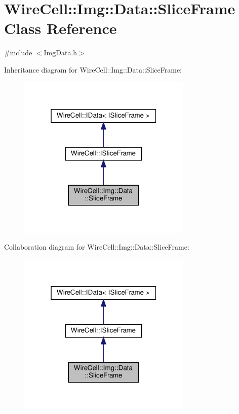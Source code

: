 \hypertarget{class_wire_cell_1_1_img_1_1_data_1_1_slice_frame}{}\section{Wire\+Cell\+:\+:Img\+:\+:Data\+:\+:Slice\+Frame Class Reference}
\label{class_wire_cell_1_1_img_1_1_data_1_1_slice_frame}


{\ttfamily \#include $<$Img\+Data.\+h$>$}



Inheritance diagram for Wire\+Cell\+:\+:Img\+:\+:Data\+:\+:Slice\+Frame\+:
\nopagebreak
\begin{figure}[H]
\begin{center}
\leavevmode
\includegraphics[width=235pt]{class_wire_cell_1_1_img_1_1_data_1_1_slice_frame__inherit__graph}
\end{center}
\end{figure}


Collaboration diagram for Wire\+Cell\+:\+:Img\+:\+:Data\+:\+:Slice\+Frame\+:
\nopagebreak
\begin{figure}[H]
\begin{center}
\leavevmode
\includegraphics[width=235pt]{class_wire_cell_1_1_img_1_1_data_1_1_slice_frame__coll__graph}
\end{center}
\end{figure}
